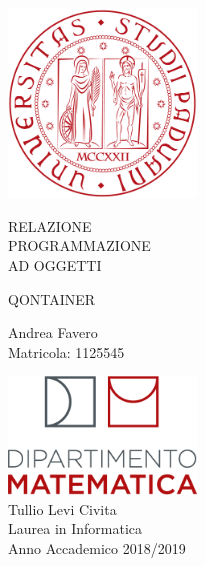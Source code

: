 \documentclass[10pt, a4paper]{article}
\newcommand{\bigsize}{\fontsize{35pt}{20pt}\selectfont}
\newcommand{\mediumsize}{\fontsize{30pt}{20pt}\selectfont}
\newcommand{\normsize}{\fontsize{15pt}{10pt}\selectfont}
\begin{document}
	
	\begin{titlepage}
		\centering
		
		\includegraphics[width=50mm]{immagini/logo.png}
		\vspace*{50px}
		
		{\bigsize RELAZIONE\\}
		\vspace*{5px}
		{\bigsize PROGRAMMAZIONE\\}
		\vspace*{5px}
		{\bigsize AD OGGETTI\\}
		\vspace*{25px}
		
		{\mediumsize QONTAINER}
		\vspace*{30px}
		
		{\mediumsize Andrea Favero\\}
		\vspace*{5px}
		{\normsize Matricola: 1125545}
		\vspace*{30px}
		
		\includegraphics[width=50mm]{immagini/dip_mat.png}\\
		\vspace*{2.5px}
		{\normsize Tullio Levi Civita\\}
		\vspace*{20px} %
		{\mediumsize  Laurea in Informatica\\ }
		\vspace*{\fill}
		{\normsize Anno Accademico 2018/2019\\ }

\end{titlepage}
{
\hypersetup{hidelinks}
\tableofcontents
}
\end{document}
